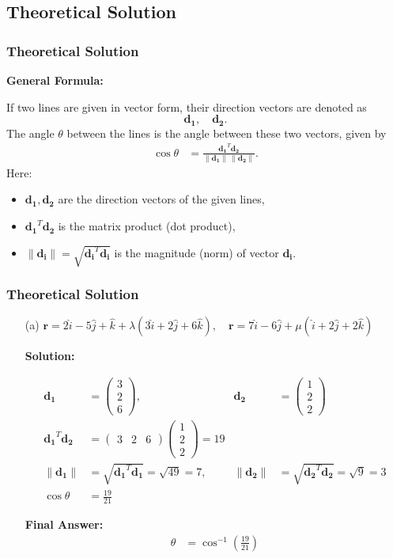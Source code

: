 \documentclass{beamer}
\theoremstyle{remark}
\newcommand{\myvec}[1]{\ensuremath{\begin{pmatrix}#1\end{pmatrix}}}
\let\vec\mathbf
\numberwithin{equation}{section}
\begin{document}
\subsection{Theoretical Solution }
\begin{frame}
\frametitle{Theoretical Solution}
\textbf{General Formula:}  

If two lines are given in vector form, their direction vectors are denoted as
$$
\vec{d_1}, \quad \vec{d_2}.
$$
The angle $\theta$ between the lines is the angle between these two vectors, given by
\begin{align}
\cos \theta &= \frac{\vec{d_1}^T \vec{d_2}}{\|\vec{d_1}\| \, \|\vec{d_2}\|}.
\end{align}
Here:
\begin{itemize}
    \item $\vec{d_1}, \vec{d_2}$ are the direction vectors of the given lines,
    \item $\vec{d_1}^T \vec{d_2}$ is the matrix product (dot product),
    \item $\|\vec{d_i}\| = \sqrt{\vec{d_i}^T \vec{d_i}}$ is the magnitude (norm) of vector $\vec{d_i}$.
\end{itemize}

\end{frame}

\begin{frame}
\frametitle{Theoretical Solution}
\begin{enumerate}
\item[(a)] 
$\vec{r} = 2\hat i - 5\hat j + \hat k + \lambda(3\hat i + 2\hat j + 6\hat k), 
\quad
\vec{r} = 7\hat i - 6\hat j + \mu(\hat i + 2\hat j + 2\hat k)$

\textbf{Solution:}  

\begin{align}
\vec{d_1} &= \myvec{3 \\ 2 \\ 6}, &
\vec{d_2} &= \myvec{1 \\ 2 \\ 2} \\[6pt]
\vec{d_1}^T \vec{d_2} &= \myvec{3 & 2 & 6}\myvec{1 \\ 2 \\ 2} = 19 \\[6pt]
\|\vec{d_1}\| &= \sqrt{\vec{d_1}^T \vec{d_1}} = \sqrt{49} = 7, &
\|\vec{d_2}\| &= \sqrt{\vec{d_2}^T \vec{d_2}} = \sqrt{9} = 3 \\[6pt]
\cos\theta &= \frac{19}{21}
\end{align}

\textbf{Final Answer:}  
\begin{align}
\theta &= \cos^{-1}\!\left(\tfrac{19}{21}\right)
\end{align}

\end{enumerate}

\end{frame}
\end{document}
